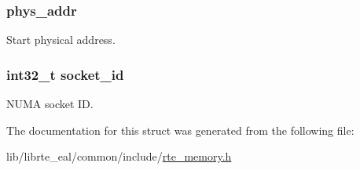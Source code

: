 \subsubsection[{phys\+\_\+addr}]{ phys\+\_\+addr}\label{structrte__memseg_a3901f538726d14b9ad14e0bd7578c959}
Start physical address. \hypertarget{structrte__memseg_ac24d1064025151de66984ed53d5d9373}{}
\subsubsection[{socket\+\_\+id}]{\setlength{\rightskip}{0pt plus 5cm}int32\+\_\+t socket\+\_\+id}\label{structrte__memseg_ac24d1064025151de66984ed53d5d9373}
N\+U\+M\+A socket I\+D. 

The documentation for this struct was generated from the following file\+:\begin{DoxyCompactItemize}
\item 
lib/librte\+\_\+eal/common/include/\hyperlink{rte__memory_8h}{rte\+\_\+memory.\+h}\end{DoxyCompactItemize}
